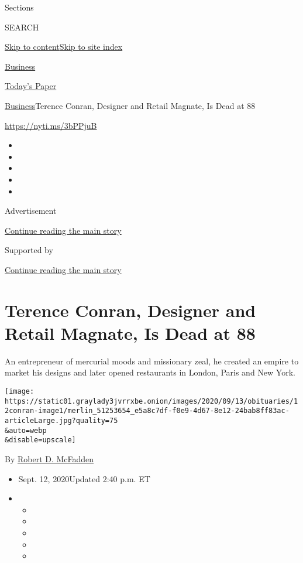 Sections

SEARCH

\protect\hyperlink{site-content}{Skip to
content}\protect\hyperlink{site-index}{Skip to site index}

\href{https://www.nytimes3xbfgragh.onion/section/business}{Business}

\href{https://myaccount.nytimes3xbfgragh.onion/auth/login?response_type=cookie\&client_id=vi}{}

\href{https://www.nytimes3xbfgragh.onion/section/todayspaper}{Today's
Paper}

\href{/section/business}{Business}\textbar{}Terence Conran, Designer and
Retail Magnate, Is Dead at 88

\url{https://nyti.ms/3bPPjuB}

\begin{itemize}
\item
\item
\item
\item
\item
\end{itemize}

Advertisement

\protect\hyperlink{after-top}{Continue reading the main story}

Supported by

\protect\hyperlink{after-sponsor}{Continue reading the main story}

\hypertarget{terence-conran-designer-and-retail-magnate-is-dead-at-88}{%
\section{Terence Conran, Designer and Retail Magnate, Is Dead at
88}\label{terence-conran-designer-and-retail-magnate-is-dead-at-88}}

An entrepreneur of mercurial moods and missionary zeal, he created an
empire to market his designs and later opened restaurants in London,
Paris and New York.

\texttt{[image: https://static01.graylady3jvrrxbe.onion/images/2020/09/13/obituaries/12conran-image1/merlin\_51253654\_e5a8c7df-f0e9-4d67-8e12-24bab8ff83ac-articleLarge.jpg?quality=75\\\&auto=webp\\\&disable=upscale]}

By \href{https://www.nytimes3xbfgragh.onion/by/robert-d-mcfadden}{Robert
D. McFadden}

\begin{itemize}
\item
  Sept. 12, 2020Updated 2:40 p.m. ET
\item
  \begin{itemize}
  \item
  \item
  \item
  \item
  \item
  \end{itemize}
\end{itemize}

